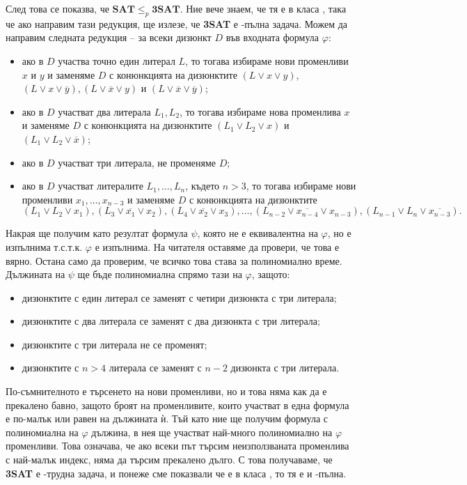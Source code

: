 След това се показва, че $\mathbf{SAT} \leq_p \mathbf{3SAT}$.
Ние вече знаем, че тя е в класа \NP, така че ако направим тази редукция, ще излезе, че \textbf{3SAT} е \NP-пълна задача.
Можем да направим следната редукция -- за всеки дизюнкт $D$ във входната формула $\varphi$:
\begin{itemize}
    \item ако в $D$ участва точно един литерал $L$, то тогава избираме нови променливи $x$ и $y$ и заменяме $D$ с конюнкцията на дизюнктите $(L \lor x \lor y)$, $(L \lor x \lor \overline{y}), (L \lor \overline{x} \lor y)$ и $(L \lor \overline{x} \lor \overline{y})$;
    \item ако в $D$ участват два литерала $L_1, L_2$, то тогава избираме нова променлива $x$ и заменяме $D$ с конюнкцията на дизюнктите $(L_1 \lor L_2 \lor x)$ и $(L_1 \lor L_2 \lor \overline{x})$;
    \item ако в $D$ участват три литерала, не променяме $D$;
    \item ако в $D$ участват литералите $L_1, \dots, L_n$, където $n > 3$, то тогава избираме нови променливи $x_1, \dots, x_{n - 3}$ и заменяме $D$ с конюнкцията на дизюнктите
          \[
              (L_1 \lor L_2 \lor x_1), (L_3 \lor \overline{x_1} \lor x_2), (L_4 \lor \overline{x_2} \lor x_3), \dots, (L_{n - 2} \lor \overline{x_{n - 4}} \lor x_{n - 3}), (L_{n - 1} \lor L_n \lor \overline{x_{n - 3}}).
          \]
\end{itemize}
Накрая ще получим като резултат формула $\psi$, която не е еквивалентна на $\varphi$, но е изпълнима т.с.т.к. $\varphi$ е изпълнима.
На читателя оставяме да провери, че това е вярно.
Остана само да проверим, че всичко това става за полиномиално време.
Дължината на $\psi$ ще бъде полиномиална спрямо тази на $\varphi$, защото:
\begin{itemize}
    \item дизюнктите с един литерал се заменят с четири дизюнкта с три литерала;
    \item дизюнктите с два литерала се заменят с два дизюнкта с три литерала;
    \item дизюнктите с три литерала не се променят;
    \item дизюнктите с $n > 4$ литерала се заменят с $n - 2$ дизюнкта с три литерала.
\end{itemize}

\newpage

По-съмнителното е търсенето на нови променливи, но и това няма как да е прекалено бавно, защото броят на променливите, които участват в една формула е по-малък или равен на дължината ѝ.
Тъй като ние ще получим формула с полиномиална на $\varphi$ дължина, в нея ще участват най-много полиномиално на $\varphi$ променливи.
Това означава, че ако всеки път търсим неизползваната променлива с най-малък индекс, няма да търсим прекалено дълго.
С това получаваме, че \textbf{3SAT} е \NP-трудна задача, и понеже сме показвали че е в класа \NP, то тя е и \NP-пълна.

